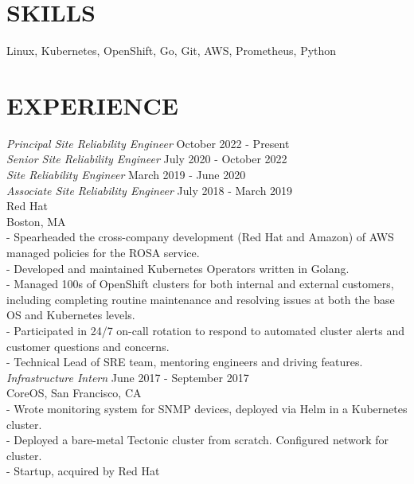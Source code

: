 \documentclass[line,margin]{res}
\begin{document}
\address{fahlmantaylor@gmail.com}
\address{github.com/fahlmant, linkedin.com/in/taylorfahlman}
\begin{resume}

                    
\section{SKILLS}
                    Linux, Kubernetes, OpenShift, Go, Git, AWS, Prometheus, Python
                    
\section{EXPERIENCE}
                    {\sl Principal Site Reliability Engineer} \hfill October 2022 - Present\\
                    {\sl Senior Site Reliability Engineer} \hfill July 2020 - October 2022\\
                    {\sl Site Reliability Engineer} \hfill March 2019 - June 2020\\
                    {\sl Associate Site Reliability Engineer} \hfill July 2018 - March 2019\\
                    Red Hat\\
                    Boston, MA\\
                    - Spearheaded the cross-company development (Red Hat and Amazon) of AWS managed policies for the ROSA service.\\
                    - Developed and maintained Kubernetes Operators written in Golang.\\
                    - Managed 100s of OpenShift clusters for both internal and external customers, including completing routine maintenance and resolving issues at both the base OS and Kubernetes levels.\\
                    - Participated in 24/7 on-call rotation to respond to automated cluster alerts and customer questions and concerns.\\
                    - Technical Lead of SRE team, mentoring engineers and driving features.\\

                    {\sl Infrastructure Intern} \hfill June 2017 - September 2017\\
                    CoreOS,
                    San Francisco, CA\\
                    - Wrote monitoring system for SNMP devices, deployed via Helm in a Kubernetes cluster.\\
                    - Deployed a bare-metal Tectonic cluster from scratch. Configured network for cluster.\\
                    - Startup, acquired by Red Hat\\


\end{resume}
\end{document}
